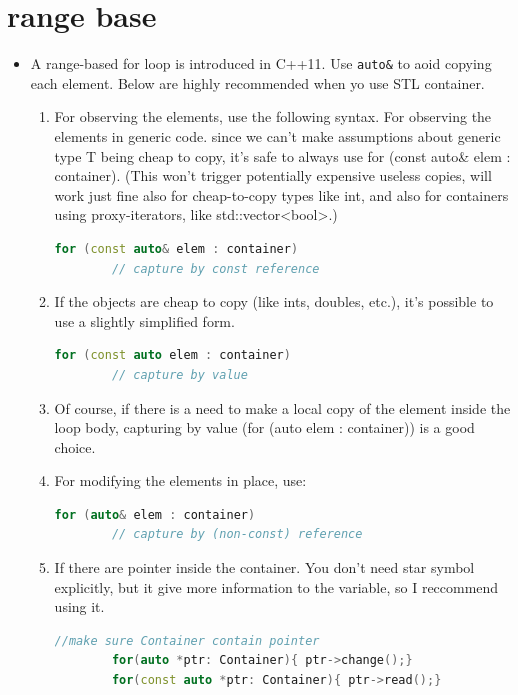 \documentclass[a4paper,12pt,twoside]{book}
\begin{document}
\section{range base}
\begin{itemize}
	
	\item A range-based for loop is introduced in C++11. Use \texttt{auto\&} to aoid copying each element. Below are highly recommended when yo use STL container.
	
	\begin{enumerate}
		\item For observing the elements, use the following syntax. For observing the elements in generic code. since we can't make assumptions about generic type T being cheap to copy, it's safe to always use for (const auto\& elem : container).
		(This won't trigger potentially expensive useless copies, will work just fine also for cheap-to-copy types like int, and also for containers using proxy-iterators, like std::vector<bool>.)
		\begin{lstlisting}[frame=single, language=c++]
		for (const auto& elem : container)    
		// capture by const reference
		\end{lstlisting}	
		
		
		\item If the objects are cheap to copy (like ints, doubles, etc.), it's possible to use a slightly simplified form. 
		
		\begin{lstlisting}[frame=single, language=c++]
		for (const auto elem : container)   
		// capture by value
		\end{lstlisting}            
		
		\item Of course, if there is a need to make a local copy of the element inside the loop body, capturing by value (for (auto elem : container)) is a good choice.
		
		\item For modifying the elements in place, use:
		\begin{lstlisting}[frame=single, language=c++]
		for (auto& elem : container)    
		// capture by (non-const) reference
		\end{lstlisting}
		
		
		
		\item If there are pointer inside the container. You don't need star symbol explicitly, but it give more information to the variable, so I reccommend using it.
		\begin{lstlisting}[frame=single, language=c++]
		//make sure Container contain pointer
		for(auto *ptr: Container){ ptr->change();}
		for(const auto *ptr: Container){ ptr->read();}
		\end{lstlisting}
		

\end{enumerate}
\end{itemize}
\end{document}
